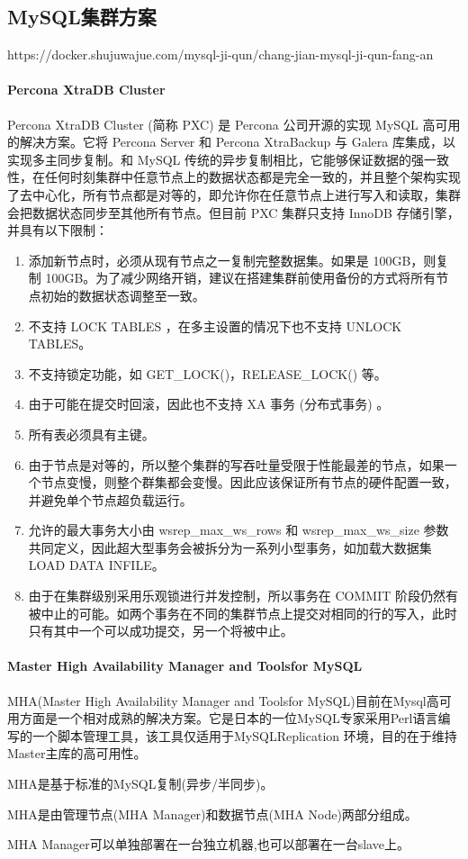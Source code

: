 \documentclass[../../../interview-questions.tex]{subfiles}
\begin{document}
\subsection{MySQL集群方案}

https://docker.shujuwajue.com/mysql-ji-qun/chang-jian-mysql-ji-qun-fang-an

\paragraph{Percona XtraDB Cluster }

Percona XtraDB Cluster (简称 PXC) 是 Percona 公司开源的实现 MySQL 高可用的解决方案。它将 Percona Server 和 Percona XtraBackup 与 Galera 库集成，以实现多主同步复制。和 MySQL 传统的异步复制相比，它能够保证数据的强一致性，在任何时刻集群中任意节点上的数据状态都是完全一致的，并且整个架构实现了去中心化，所有节点都是对等的，即允许你在任意节点上进行写入和读取，集群会把数据状态同步至其他所有节点。但目前 PXC 集群只支持 InnoDB 存储引擎，并具有以下限制：

\begin{enumerate}
    \item {添加新节点时，必须从现有节点之一复制完整数据集。如果是 100GB，则复制 100GB。为了减少网络开销，建议在搭建集群前使用备份的方式将所有节点初始的数据状态调整至一致。}
    \item {不支持 LOCK TABLES ，在多主设置的情况下也不支持 UNLOCK TABLES。}
    \item {不支持锁定功能，如 GET\_LOCK()，RELEASE\_LOCK() 等。}
    \item {由于可能在提交时回滚，因此也不支持 XA 事务 (分布式事务) 。}
    \item {所有表必须具有主键。}
    \item {由于节点是对等的，所以整个集群的写吞吐量受限于性能最差的节点，如果一个节点变慢，则整个群集都会变慢。因此应该保证所有节点的硬件配置一致，并避免单个节点超负载运行。}
    \item {允许的最大事务大小由 wsrep\_max\_ws\_rows 和 wsrep\_max\_ws\_size 参数共同定义，因此超大型事务会被拆分为一系列小型事务，如加载大数据集 LOAD DATA INFILE。}
    \item {由于在集群级别采用乐观锁进行并发控制，所以事务在 COMMIT 阶段仍然有被中止的可能。如两个事务在不同的集群节点上提交对相同的行的写入，此时只有其中一个可以成功提交，另一个将被中止。}
\end{enumerate}




\paragraph{Master High Availability Manager and Toolsfor MySQL}

MHA(Master High Availability Manager and Toolsfor MySQL)目前在Mysql高可用方面是一个相对成熟的解决方案。它是日本的一位MySQL专家采用Perl语言编写的一个脚本管理工具，该工具仅适用于MySQLReplication 环境，目的在于维持Master主库的高可用性。

MHA是基于标准的MySQL复制(异步/半同步)。

MHA是由管理节点(MHA Manager)和数据节点(MHA Node)两部分组成。

MHA Manager可以单独部署在一台独立机器,也可以部署在一台slave上。
\end{document}
